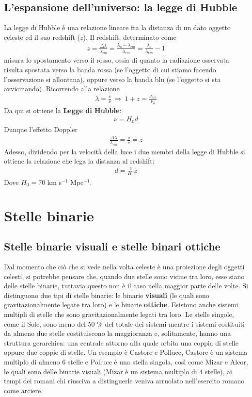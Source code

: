 \documentclass[a4paper, oneside]{book}
\begin{document}
\section{L'espansione dell'universo: la legge di Hubble}
La legge di Hubble è una relazione lineare fra la distanza di un dato oggetto 
celeste ed il suo redshift ($z$). Il redshift, determinato come 
\begin{gather*}
    z = \frac{\Delta \lambda}{\lambda_{em}} = \frac{\lambda_{o} - \lambda_{em}}{\lambda_{em}} = \frac{\lambda_{o}}{\lambda_{em}} - 1
\end{gather*}
misura lo spostamento verso il rosso, ossia di quanto la radiazione osservata risulta spostata verso la 
banda rossa (se l'oggetto di cui stiamo facendo l'osservazione si allontana), oppure verso la banda blu
(se l'oggetto si sta avvicinando). Ricorrendo alla relazione
\begin{gather*}
    \lambda = \frac{c}{\nu} \ \Longrightarrow \ 1 + z = \frac{\nu_{em}}{\nu_{o}}
\end{gather*}
Da qui si ottiene la \textbf{Legge di Hubble}:
\begin{align}
    \nu = H_0 d
\end{align}
Dunque l'effetto Doppler 
\begin{align}
    \frac{\Delta \lambda}{\lambda_{em}} = \frac{\nu}{c} = z
\end{align}
Adesso, dividendo per la velocità della luce i due membri della legge di Hubble si ottiene la relazione
che lega la distanza al redshift:
\begin{align}
    d = \frac{c}{H_0}z
\end{align}
Dove $H_0 = 70$ km s$^{-1}$ Mpc$^{-1}$. 


\chapter{Stelle binarie}
\section{Stelle binarie visuali e stelle binari ottiche}
Dal momento che ciò che si vede nella volta celeste è una proiezione degli oggetti celesti, 
si potrebbe pensare che, quando due stelle sono vicine tra loro, esse siano 
delle stelle binarie, tuttavia questo non è il caso nella maggior parte delle volte. Si distinguono 
due tipi di stelle binarie: le binarie \textbf{visuali} (le quali sono 
gravitazionalmente legate tra loro) e le binarie \textbf{ottiche}. Esistono 
anche sistemi multipli di stelle che sono gravitazionalmente legati tra loro. Le stelle singole, 
come il Sole, sono meno del 50 \% del totale dei sistemi mentre i sistemi costituiti
da almeno due stelle costituiscono la maggioranza e, solitamente, hanno una struttura gerarchica: 
una centrale attorno alla quale orbita una coppia di stelle oppure due coppie di stelle. Un esempio 
è Castore e Polluce, Castore è un sistema multiplo di almeno 6 stelle e Polluce è una stella singola, 
così come Mizar e Alcor, le quali sono delle binarie visuali (Mizar è un sistema multiplo di 4 stelle),
ai tempi dei romani chi riusciva a distinguerle veniva arruolato nell'esercito romano
come arciere.
\end{document}

